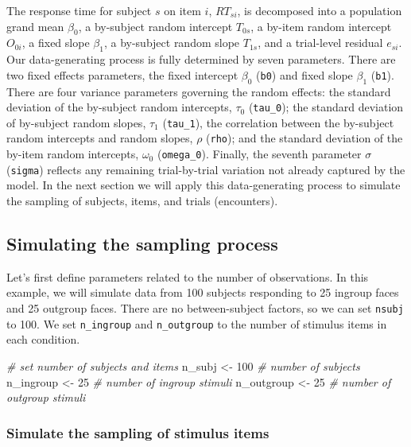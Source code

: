 \documentclass[english,doc,floatsintext]{apa6}
\newenvironment{Shaded}{\begin{snugshade}}{\end{snugshade}}
\newcommand{\CommentTok}[1]{\textcolor[rgb]{0.56,0.35,0.01}{\textit{#1}}}
\newcommand{\DecValTok}[1]{\textcolor[rgb]{0.00,0.00,0.81}{#1}}
\newcommand{\NormalTok}[1]{#1}
\newcommand{\StringTok}[1]{\textcolor[rgb]{0.31,0.60,0.02}{#1}}
\begin{document}
\noindent The response time for subject \(s\) on item \(i\), \(RT_{si}\), is decomposed into a population grand mean \(\beta_0\), a by-subject random intercept \(T_{0s}\), a by-item random intercept \(O_{0i}\), a fixed slope \(\beta_1\), a by-subject random slope \(T_{1s}\), and a trial-level residual \(e_{si}\). Our data-generating process is fully determined by seven parameters. There are two fixed effects parameters, the fixed intercept \(\beta_0\) (\texttt{b0}) and fixed slope \(\beta_1\) (\texttt{b1}). There are four variance parameters governing the random effects: the standard deviation of the by-subject random intercepts, \(\tau_0\) (\texttt{tau\_0}); the standard deviation of by-subject random slopes, \(\tau_1\) (\texttt{tau\_1}), the correlation between the by-subject random intercepts and random slopes, \(\rho\) (\texttt{rho}); and the standard deviation of the by-item random intercepts, \(\omega_0\) (\texttt{omega\_0}). Finally, the seventh parameter \(\sigma\) (\texttt{sigma}) reflects any remaining trial-by-trial variation not already captured by the model. In the next section we will apply this data-generating process to simulate the sampling of subjects, items, and trials (encounters).

\hypertarget{simulating-the-sampling-process}{%
\subsection{Simulating the sampling process}\label{simulating-the-sampling-process}}

Let's first define parameters related to the number of observations. In this example, we will simulate data from 100 subjects responding to 25 ingroup faces and 25 outgroup faces. There are no between-subject factors, so we can set \texttt{nsubj} to 100. We set \texttt{n\_ingroup} and \texttt{n\_outgroup} to the number of stimulus items in each condition.

\begin{Shaded}
\begin{Highlighting}[]
\CommentTok{# set number of subjects and items}
\NormalTok{n_subj  <-}\StringTok{ }\DecValTok{100} \CommentTok{# number of subjects}
\NormalTok{n_ingroup <-}\StringTok{ }\DecValTok{25} \CommentTok{# number of ingroup stimuli}
\NormalTok{n_outgroup <-}\StringTok{ }\DecValTok{25} \CommentTok{# number of outgroup stimuli}
\end{Highlighting}
\end{Shaded}

\hypertarget{simulate-the-sampling-of-stimulus-items}{%
\subsubsection{Simulate the sampling of stimulus items}\label{simulate-the-sampling-of-stimulus-items}}
\end{document}
